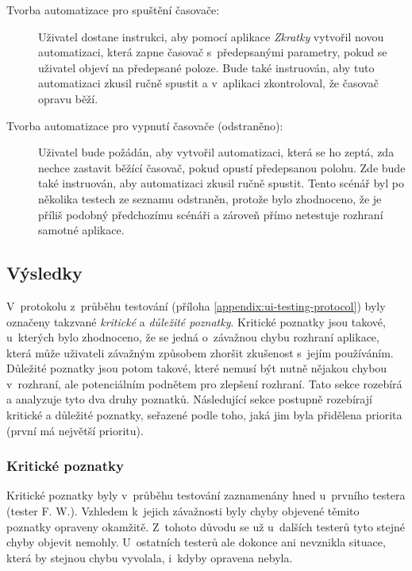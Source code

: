\begin{description}
\item[Tvorba automatizace pro spuštění časovače:] Uživatel dostane instrukci, aby pomocí aplikace \emph{Zkratky} vytvořil novou automatizaci, která zapne časovač s~předepsanými parametry, pokud se uživatel objeví na předepsané poloze. Bude také instruován, aby tuto automatizaci zkusil ručně spustit a v~aplikaci zkontroloval, že časovač opravu běží.
\item[Tvorba automatizace pro vypnutí časovače (odstraněno):] Uživatel bude požádán, aby vytvořil automatizaci, která se ho zeptá, zda nechce zastavit běžící časovač, pokud opustí předepsanou polohu. Zde bude také instruován, aby automatizaci zkusil ručně spustit. Tento scénář byl po několika testech ze seznamu odstraněn, protože bylo zhodnoceno, že je příliš podobný předchozímu scénáři a zároveň přímo netestuje rozhraní samotné aplikace.
\end{description}

\subsection{Výsledky}

V~protokolu z~průběhu testování (příloha \ref{appendix:ui-testing-protocol}) byly označeny takzvané \emph{kritické} a \emph{důležité poznatky}. Kritické poznatky jsou takové, u~kterých bylo zhodnoceno, že se jedná o~závažnou chybu rozhraní aplikace, která může uživateli závažným způsobem zhoršit zkušenost s~jejím používáním. Důležité poznatky jsou potom takové, které nemusí být nutně nějakou chybou v~rozhraní, ale potenciálním podnětem pro zlepšení rozhraní. Tato sekce rozebírá a analyzuje tyto dva druhy poznatků. Následující sekce postupně rozebírají kritické a důležité poznatky, seřazené podle toho, jaká jim byla přidělena priorita (první má největší prioritu).

\subsubsection{Kritické poznatky}

Kritické poznatky byly v~průběhu testování zaznamenány hned u~prvního testera (tester F. W.). Vzhledem k~jejich závažnosti byly chyby objevené těmito poznatky opraveny okamžitě. Z~tohoto důvodu se už u~dalších testerů tyto stejné chyby objevit nemohly. U~ostatních testerů ale dokonce ani nevznikla situace, která by stejnou chybu vyvolala, i~kdyby opravena nebyla.

